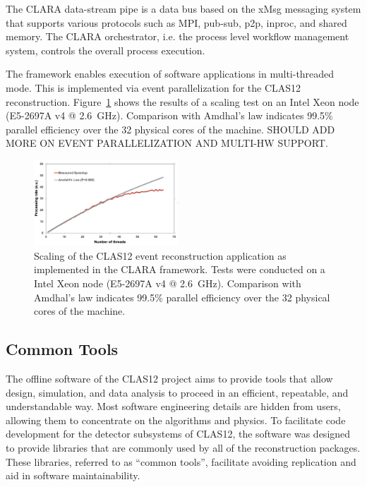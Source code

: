 The CLARA data-stream pipe is a data bus based on the xMsg messaging system that supports various protocols
such as MPI, pub-sub, p2p, inproc, and shared memory. The CLARA orchestrator, i.e. the process level workflow
management system, controls the overall process execution. 

The framework enables execution of software applications in multi-threaded mode. This is implemented via event
parallelization for the CLAS12 reconstruction. Figure~\ref{fig:scaling} shows the results of a scaling test on an
Intel Xeon node (E5-2697A v4 @ 2.6~GHz). Comparison with Amdhal's law indicates 99.5\% parallel efficiency over
the 32 physical cores of the machine.
{\color{red} SHOULD ADD MORE ON EVENT PARALLELIZATION AND MULTI-HW SUPPORT.}

\begin{figure}
\centering
\includegraphics[width=0.48\textwidth]{pics/scaling.png}
\caption{Scaling of the CLAS12 event reconstruction application as implemented in the CLARA framework. Tests
  were conducted on a Intel Xeon node (E5-2697A v4 @ 2.6~GHz). Comparison with Amdhal's law indicates 99.5\%
  parallel efficiency over the 32 physical cores of the machine.}
\label{fig:scaling}
\end{figure}

\subsection{Common Tools}
\label{common-tools}

The offline software of the CLAS12 project aims to provide tools that allow design, simulation, and data analysis
to proceed in an efficient, repeatable, and understandable way. Most  software engineering details are hidden from
users, allowing them to concentrate on the algorithms and physics. To facilitate code development for the detector
subsystems of CLAS12, the software was designed to provide libraries that are commonly used by all of the
reconstruction packages.  These libraries, referred to as ``common tools'', facilitate avoiding replication and aid
in software maintainability.

